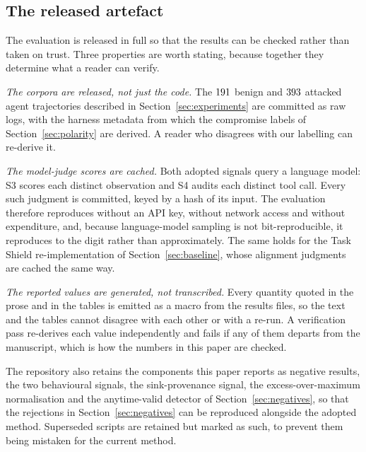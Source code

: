 \documentclass[pdflatex,sn-basic]{sn-jnl}%
\theoremstyle{thmstyleone}
\theoremstyle{thmstyletwo}
\theoremstyle{thmstylethree}
\begin{document}
\begin{appendices}

\section{The released artefact}\label{app:artefact}

The evaluation is released in full so that the results can be checked rather than
taken on trust. Three properties are worth stating, because together they
determine what a reader can verify.

\emph{The corpora are released, not just the code.} The $191$ benign and
$393$ attacked agent trajectories described in Section~\ref{sec:experiments}
are committed as raw logs, with the harness metadata from which the compromise
labels of Section~\ref{sec:polarity} are derived. A reader who disagrees with our
labelling can re-derive it.

\emph{The model-judge scores are cached.} Both adopted signals query a language
model: S3 scores each distinct observation and S4 audits each distinct tool call.
Every such judgment is committed, keyed by a hash of its input. The evaluation
therefore reproduces without an API key, without network access and without
expenditure, and, because language-model sampling is not bit-reproducible, it
reproduces to the digit rather than approximately. The same holds for the Task
Shield re-implementation of Section~\ref{sec:baseline}, whose alignment judgments
are cached the same way.

\emph{The reported values are generated, not transcribed.} Every quantity quoted
in the prose and in the tables is emitted as a macro from the results files, so
the text and the tables cannot disagree with each other or with a re-run. A
verification pass re-derives each value independently and fails if any of them
departs from the manuscript, which is how the numbers in this paper are checked.

The repository also retains the components this paper reports as negative
results, the two behavioural signals, the sink-provenance signal, the
excess-over-maximum normalisation and the anytime-valid detector of
Section~\ref{sec:negatives}, so that the rejections in Section~\ref{sec:negatives}
can be reproduced alongside the adopted method. Superseded scripts are retained
but marked as such, to prevent them being mistaken for the current method.

\end{appendices}


\end{document}
